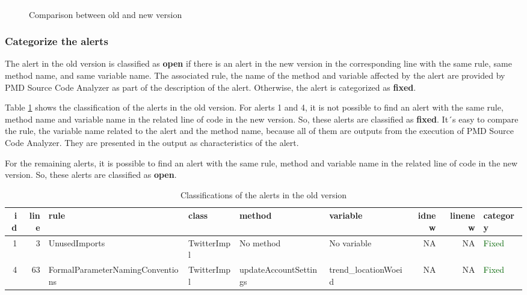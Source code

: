 \documentclass[
]{article}
\begin{document}
\begin{landscape}
\normalsize

\begin{figure}
\centering
\includegraphics{figures/fake.png}
\caption{Comparison between old and new version \label{comparison}}
\end{figure}

\end{landscape}

\newpage

\subsubsection{Categorize the alerts}\label{categorize}

The alert in the old version is classified as \textbf{open} if there is
an alert in the new version in the corresponding line with the same
rule, same method name, and same variable name. The associated rule, the
name of the method and variable affected by the alert are provided by
PMD Source Code Analyzer as part of the description of the alert.
Otherwise, the alert is categorized as \textbf{fixed}.

Table \ref{class_old} shows the classification of the alerts in the old
version. For alerts 1 and 4, it is not possible to find an alert with
the same rule, method name and variable name in the related line of code
in the new version. So, these alerts are classified as \textbf{fixed}.
It´s easy to compare the rule, the variable name related to the alert
and the method name, because all of them are outputs from the execution
of PMD Source Code Analyzer. They are presented in the output as
characteristics of the alert.

For the remaining alerts, it is possible to find an alert with the same
rule, method and variable name in the related line of code in the new
version. So, these alerts are classified as \textbf{open}.

\small

\normalsize

\small

\begin{table}[!h]

\caption{\label{tab:unnamed-chunk-2}Classifications of the alerts in the old version \label{class_old}}
\centering
\fontsize{6}{8}\selectfont
\begin{tabular}[t]{rrllllrrl}
\toprule
id & line & rule & class & method & variable & idnew & linenew & category\\
\midrule
\rowcolor{gray!6}  1 & 3 & UnusedImports & TwitterImpl & No method & No variable & NA & NA & \textcolor{darkgreen}{Fixed}\\
4 & 63 & FormalParameterNamingConventions & TwitterImpl & updateAccountSettings & trend\_locationWoeid & NA & NA & \textcolor{darkgreen}{Fixed}\\
\bottomrule
\end{tabular}
\end{table}
\end{document}
